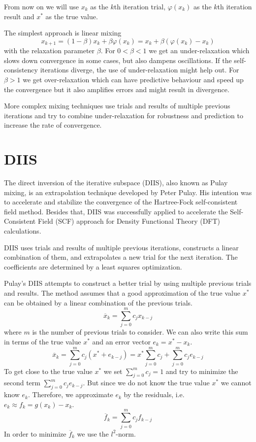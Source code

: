 From now on we will use $x_k$ as the $k$th iteration trial, $\varphi(x_k)$ as the $k$th iteration result and $x^\ast$ as the true value.

The simplest approach is linear mixing
\begin{equation} \label{eq:linmix}
x_{k+1} = (1-\beta) x_k + \beta \varphi(x_k) = x_k + \beta (\varphi(x_k) - x_k)
\end{equation}
with the relaxation parameter \(\beta\).
For \(0 < \beta < 1\) we get an under-relaxation which slows down convergence in some cases, but also dampens oscillations. If the self-consistency iterations diverge, the use of under-relaxation might help out.
For \(\beta > 1\) we get over-relaxation which can have predictive behaviour and speed up the convergence but it also amplifies errors and might result in divergence.

More complex mixing techniques use trials and results of multiple previous iterations and try to combine under-relaxation for robustness and prediction to increase the rate of convergence.\cite{anderson_mixing}

\section{DIIS}
The direct inversion of the iterative subspace (DIIS), also known as Pulay mixing, is an extrapolation technique developed by Peter Pulay.\cite{diis_pulay1}\cite{diis_pulay2} His intention was to accelerate and stabilize the convergence of the Hartree-Fock self-consistent field method. Besides that, DIIS was successfully applied to accelerate the Self-Consistent Field (SCF) approach for Density Functional Theory (DFT) calculations.\cite{diis_restarted}

DIIS uses trials and results of multiple previous iterations, constructs a linear combination of them, and extrapolates a new trial for the next iteration. The coefficients are determined by a least squares optimization.

Pulay's DIIS attempts to construct a better trial by using multiple previous trials and results. The method assumes that a good approximation of the true value \(x^\ast\) can be obtained by a linear combination of the previous trials.
\begin{equation} \label{eq:diis_x}
\overline{x}_{k} = \sum_{j=0}^{m} c_j x_{k-j}
\end{equation}
where \(m\) is the number of previous trials to consider. We can also write this sum in terms of the true value \(x^\ast\) and an error vector \(e_{k} = x^\ast - x_{k}\).
\[\overline{x}_{k} = \sum_{j=0}^{m} c_j (x^\ast + e_{k-j}) = x^\ast \sum_{j=0}^{m} c_j + \sum_{j=0}^{m} c_j e_{k-j}\]
To get close to the true value \(x^\ast\) we set \(\sum_{j=0}^{m} c_j = 1\) and try to minimize the second term \(\sum_{j=0}^{m} c_j e_{k-j}\). But since we do not know the true value \(x^\ast\) we cannot know \(e_{k}\). Therefore, we approximate \(e_{k}\) by the residuals, i.e. \(e_{k} \approx f_{k} = g(x_k) - x_k\).
\[\overline{f}_{k} = \sum_{j=0}^{m} c_j f_{k-j}\]
In order to minimize \(\overline{f}_{k}\) we use the \(l^2\)-norm.

